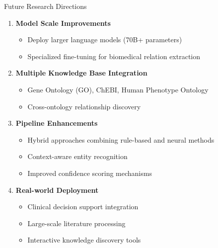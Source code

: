 \documentclass[aspectratio=169, 11pt]{beamer}
\begin{document}
\begin{frame}{Future Research Directions}
    \vspace{0.2cm}
    \begin{enumerate}
        \setlength{\itemsep}{0.4cm}
        \item \textbf{Model Scale Improvements}
        \begin{itemize}
            \setlength{\itemsep}{0.1cm}
            \item Deploy larger language models (70B+ parameters)
            \item Specialized fine-tuning for biomedical relation extraction
        \end{itemize}
        
        \item \textbf{Multiple Knowledge Base Integration}
        \begin{itemize}
            \setlength{\itemsep}{0.1cm}
            \item Gene Ontology (GO), ChEBI, Human Phenotype Ontology
            \item Cross-ontology relationship discovery
        \end{itemize}
        
        \item \textbf{Pipeline Enhancements}
        \begin{itemize}
            \setlength{\itemsep}{0.1cm}
            \item Hybrid approaches combining rule-based and neural methods
            \item Context-aware entity recognition
            \item Improved confidence scoring mechanisms
        \end{itemize}
        
        \item \textbf{Real-world Deployment}
        \begin{itemize}
            \setlength{\itemsep}{0.1cm}
            \item Clinical decision support integration
            \item Large-scale literature processing
            \item Interactive knowledge discovery tools
        \end{itemize}
    \end{enumerate}
\end{frame}
\end{document}
